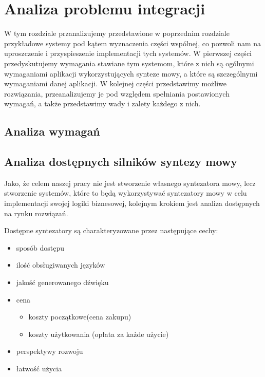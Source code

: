 
\chapter{Analiza problemu integracji} %



\ifpdf
    \graphicspath{{4/figures/PNG/}{4/figures/PDF/}{4/figures/}}
\else
    \graphicspath{{4/figures/EPS/}{4/figures/}}
\fi



W tym rozdziale przanalizujemy przedstawione w poprzednim rozdziale przykładowe systemy pod kątem wyznaczenia części wspólnej, co pozwoli nam na uproszczenie i przyspieszenie implementacji tych systemów. W pierwszej części przedyskutujemy wymagania stawiane tym systemom, które z nich są ogólnymi wymaganiami aplikacji wykorzystujących synteze mowy, a które są szczególnymi wymaganiami danej aplikacji. W kolejnej części przedstawimy możliwe rozwiązania, przeanalizujemy je pod względem spełniania postawionych wymagań, a także przedstawimy wady i zalety każdego z nich.

\section {Analiza wymagań}

\section {Analiza dostępnych silników syntezy mowy}

Jako, że celem naszej pracy nie jest stworzenie własnego syntezatora mowy, lecz stworzenie systemów, które to będą wykorzystywać syntezatory mowy w celu implementacji swojej logiki biznesowej, kolejnym krokiem jest analiza dostępnych na rynku rozwiązań. 

Dostępne syntezatory są charakteryzowane przez następujące cechy:
\begin{itemize}
	\item sposób dostępu
	\item ilość obsługiwanych języków
	\item jakość generowanego dźwięku
	\item cena
	\begin{itemize}
		\item koszty początkowe(cena zakupu)
		\item koszty użytkowania (opłata za każde użycie)
	\end{itemize}
	\item perspektywy rozwoju
	\item łatwość użycia
\end{itemize}

